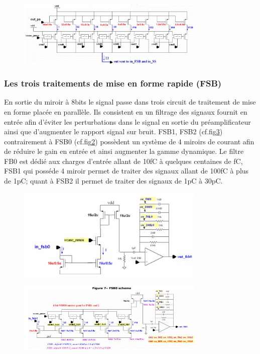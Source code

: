 \begin{figure}[ht!]
	\centering
	\includegraphics[width=0.8\textwidth]{GLA/miror.png}
	\label{mirror}
\end{figure}

\subsubsection{Les trois traitements de mise en forme rapide (FSB)}
En sortie du miroir à 8bits le signal passe dans trois circuit de traitement de mise en forme placée en parallèle. Ils consistent en un filtrage des signaux fournit en entrée afin d'éviter les perturbations dans le signal en sortie du préamplificateur ainsi que d'augmenter le rapport signal sur bruit. FSB1, FSB2 (cf.fig\ref{fsb1}) contrairement à FSB0 (cf.fig\ref{fsb0}) possèdent un système de 4 miroirs de courant afin de réduire le gain en entrée et ainsi augmenter la gamme dynamique. Le filtre FB0 est dédié aux charges d'entrée allant de 10fC à quelques centaines de fC, FSB1 qui posséde 4 miroir permet de traiter des signaux allant de 100fC à plus de 1pC; quant à FSB2 il permet de traiter des signaux de 1pC à 30pC.
\begin{figure}[ht!]
	\centering
	\includegraphics[width=0.8\textwidth]{GLA/FSB0.png}
	\label{fsb0}
\end{figure}
\begin{figure}[ht!]
	\centering
	\includegraphics[width=0.8\textwidth]{GLA/FSB1.png}
	\label{fsb1}
\end{figure}
